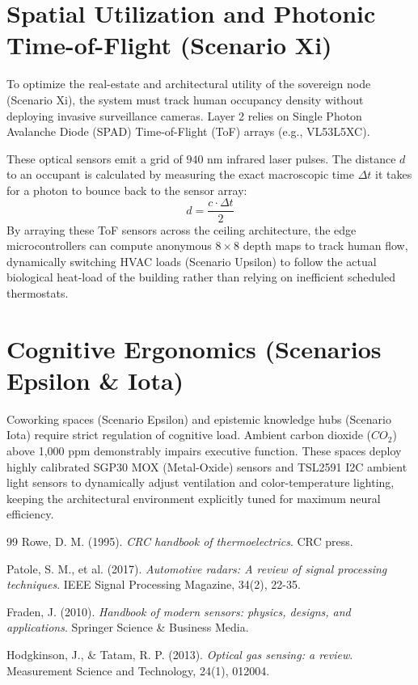 \section{Spatial Utilization and Photonic Time-of-Flight (Scenario Xi)}
To optimize the real-estate and architectural utility of the sovereign node (Scenario Xi), the system must track human occupancy density without deploying invasive surveillance cameras. Layer 2 relies on Single Photon Avalanche Diode (SPAD) Time-of-Flight (ToF) arrays (e.g., VL53L5XC). 

These optical sensors emit a grid of $940 \text{ nm}$ infrared laser pulses. The distance $d$ to an occupant is calculated by measuring the exact macroscopic time $\Delta t$ it takes for a photon to bounce back to the sensor array:
\begin{equation}
d = \frac{c \cdot \Delta t}{2}
\end{equation}
By arraying these ToF sensors across the ceiling architecture, the edge microcontrollers can compute anonymous $8 \times 8$ depth maps to track human flow, dynamically switching HVAC loads (Scenario Upsilon) to follow the actual biological heat-load of the building rather than relying on inefficient scheduled thermostats.

\section{Cognitive Ergonomics (Scenarios Epsilon \& Iota)}
Coworking spaces (Scenario Epsilon) and epistemic knowledge hubs (Scenario Iota) require strict regulation of cognitive load. Ambient carbon dioxide ($CO_2$) above 1,000 ppm demonstrably impairs executive function. These spaces deploy highly calibrated SGP30 MOX (Metal-Oxide) sensors and TSL2591 I2C ambient light sensors to dynamically adjust ventilation and color-temperature lighting, keeping the architectural environment explicitly tuned for maximum neural efficiency.

\vspace{1cm}
\begin{thebibliography}{99}
Rowe, D. M. (1995). \textit{CRC handbook of thermoelectrics}. CRC press.

Patole, S. M., et al. (2017). \textit{Automotive radars: A review of signal processing techniques}. IEEE Signal Processing Magazine, 34(2), 22-35.

Fraden, J. (2010). \textit{Handbook of modern sensors: physics, designs, and applications}. Springer Science \& Business Media.

Hodgkinson, J., \& Tatam, R. P. (2013). \textit{Optical gas sensing: a review}. Measurement Science and Technology, 24(1), 012004.
\end{thebibliography}
